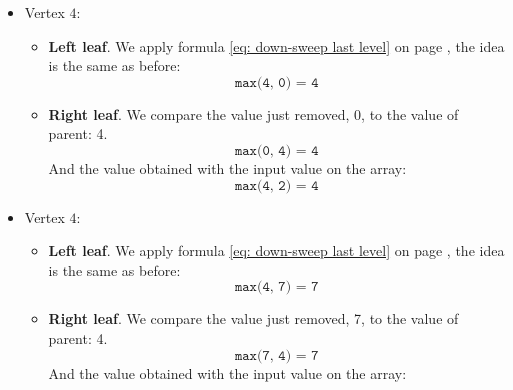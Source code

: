 \begin{itemize}
\begin{itemize}
\begin{enumerate}
\begin{examplebox}
\begin{enumerate}
\begin{itemize}
\begin{itemize}
                        \end{itemize}
                        \item Vertex $4$:
                        \begin{itemize}
                            \item \textbf{Left leaf}. We apply formula \ref{eq: down-sweep last level} on page \pageref{eq: down-sweep last level}, the idea is the same as before:
                            \begin{equation*}
                                \texttt{max(4, 0) = 4}
                            \end{equation*}
                            \item \textbf{Right leaf}. We compare the value just removed, 0, to the value of parent: 4.
                            \begin{equation*}
                                \texttt{max(0, 4) = 4}
                            \end{equation*}
                            And the value obtained with the input value on the array:
                            \begin{equation*}
                                \texttt{max(4, 2) = 4}
                            \end{equation*}
                        \end{itemize}
                        \item Vertex $4$:
                        \begin{itemize}
                            \item \textbf{Left leaf}. We apply formula \ref{eq: down-sweep last level} on page \pageref{eq: down-sweep last level}, the idea is the same as before:
                            \begin{equation*}
                                \texttt{max(4, 7) = 7}
                            \end{equation*}
                            \item \textbf{Right leaf}. We compare the value just removed, 7, to the value of parent: 4.
                            \begin{equation*}
                                \texttt{max(7, 4) = 7}
                            \end{equation*}
                            And the value obtained with the input value on the array:
                            \begin{equation*}

\end{equation*}
\end{itemize}
\end{itemize}
\end{enumerate}
\end{examplebox}
\end{enumerate}
\end{itemize}
\end{itemize}
